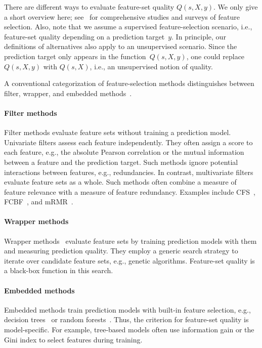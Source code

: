 \documentclass{article}
\theoremstyle{definition}
\begin{document}
There are different ways to evaluate feature-set quality $Q(s,X,y)$.
We only give a short overview here; see~\cite{chandrashekar2014survey, li2017feature, njoku2023wrapper} for comprehensive studies and surveys of feature selection.
Also, note that we assume a supervised feature-selection scenario, i.e., feature-set quality depending on a prediction target~$y$.
In principle, our definitions of alternatives also apply to an unsupervised scenario.
Since the prediction target only appears in the function~$Q(s,X,y)$, one could replace~$Q(s,X,y)$ with $Q(s,X)$, i.e., an unsupervised notion of quality.

A conventional categorization of feature-selection methods distinguishes between filter, wrapper, and embedded methods~\cite{guyon2003introduction}.

\paragraph{Filter methods}

Filter methods evaluate feature sets without training a prediction model.
Univariate filters assess each feature independently.
They often assign a score to each feature, e.g., the absolute Pearson correlation or the mutual information between a feature and the prediction target.
Such methods ignore potential interactions between features, e.g., redundancies.
In contrast, multivariate filters evaluate feature sets as a whole.
Such methods often combine a measure of feature relevance with a measure of feature redundancy.
Examples include CFS~\cite{hall1999correlation, hall2000correlation}, FCBF~\cite{yu2003feature}, and mRMR~\cite{peng2005feature}.

\paragraph{Wrapper methods}

Wrapper methods~\cite{kohavi1997wrappers} evaluate feature sets by training prediction models with them and measuring prediction quality.
They employ a generic search strategy to iterate over candidate feature sets, e.g., genetic algorithms.
Feature-set quality is a black-box function in this search.

\paragraph{Embedded methods}

Embedded methods train prediction models with built-in feature selection, e.g., decision trees~\cite{breiman1984classification} or random forests~\cite{breiman2001random}.
Thus, the criterion for feature-set quality is model-specific.
For example, tree-based models often use information gain or the Gini index to select features during training.
\end{document}
